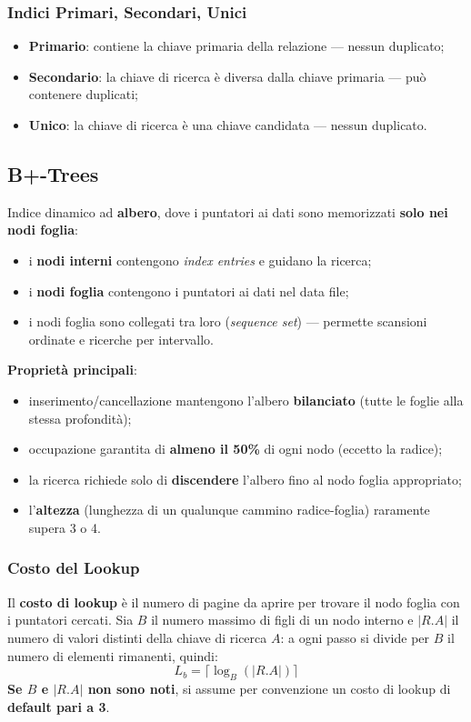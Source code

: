 \documentclass[12pt, a4paper]{article}
\begin{document}
\subsubsection{Indici Primari, Secondari, Unici}
\begin{itemize}
    \item \textbf{Primario}: contiene la chiave primaria della relazione — nessun duplicato;
    \item \textbf{Secondario}: la chiave di ricerca è diversa dalla chiave primaria — può contenere duplicati;
    \item \textbf{Unico}: la chiave di ricerca è una chiave candidata — nessun duplicato.
\end{itemize}

\subsection{B+-Trees}
Indice dinamico ad \textbf{albero}, dove i puntatori ai dati sono memorizzati \textbf{solo nei nodi foglia}:
\begin{itemize}
    \item i \textbf{nodi interni} contengono \textit{index entries} e guidano la ricerca;
    \item i \textbf{nodi foglia} contengono i puntatori ai dati nel data file;
    \item i nodi foglia sono collegati tra loro (\textit{sequence set}) — permette scansioni ordinate e ricerche per intervallo.
\end{itemize}

\textbf{Proprietà principali}:
\begin{itemize}
    \item inserimento/cancellazione mantengono l'albero \textbf{bilanciato} (tutte le foglie alla stessa profondità);
    \item occupazione garantita di \textbf{almeno il 50\%} di ogni nodo (eccetto la radice);
    \item la ricerca richiede solo di \textbf{discendere} l'albero fino al nodo foglia appropriato;
    \item l'\textbf{altezza} (lunghezza di un qualunque cammino radice-foglia) raramente supera 3 o 4.
\end{itemize}

\subsubsection{Costo del Lookup}
Il \textbf{costo di lookup} è il numero di pagine da aprire per trovare il nodo foglia con i puntatori cercati. Sia $B$ il numero massimo di figli di un nodo interno e $|R.A|$ il numero di valori distinti della chiave di ricerca $A$: a ogni passo si divide per $B$ il numero di elementi rimanenti, quindi:
$$L_b = \lceil \log_B(|R.A|) \rceil$$
\textbf{Se $B$ e $|R.A|$ non sono noti}, si assume per convenzione un costo di lookup di \textbf{default pari a 3}.
\end{document}
